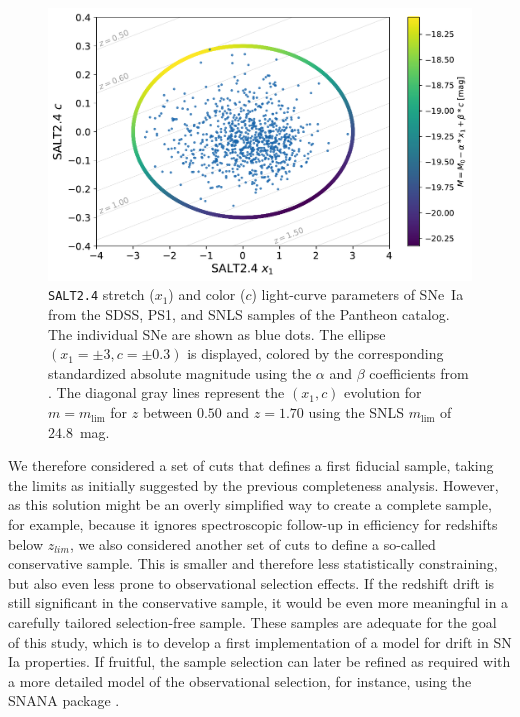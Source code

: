 \documentclass[]{aa}
\begin{document}
\begin{figure}
    \centering
    \includegraphics[width=0.95\linewidth]{Article_figures/zmax_maglim_snls.pdf}
    \caption{\textsc{\texttt{SALT2.4}} stretch ($x_1$) and color ($c$)
        light-curve parameters of SNe~Ia from the SDSS, PS1, and SNLS samples of
        the Pantheon catalog. The individual SNe are shown as blue dots. The
        ellipse $(x_1=\pm3, c=\pm0.3)$ is displayed, colored by the
        corresponding standardized absolute magnitude using the $\alpha$ and
        $\beta$ coefficients from \cite{scolnic2018a}. The diagonal gray lines
        represent the $(x_1, c)$ evolution for $m = m_{\lim}$ for $z$ between
        $0.50$ and $z=1.70$ using the SNLS $m_{\lim}$ of $24.8$~mag.}
    \label{fig:maglim}
\end{figure}

We therefore considered a set of cuts that defines a first fiducial sample,
taking the limits as initially suggested by the previous completeness analysis.
However, as this solution might be an overly simplified way to create a complete
sample, for example, because it ignores spectroscopic follow-up in efficiency
for redshifts below $z_{lim}$, we also considered another set of cuts to define
a so-called conservative sample. This is smaller and therefore less
statistically constraining, but also even less prone to observational selection
effects. If the redshift drift is still significant in the conservative sample,
it would be even more meaningful in a carefully tailored selection-free sample.
These samples are adequate for the goal of this study, which is to develop a
first implementation of a model for drift in SN Ia properties. If fruitful, the
sample selection can later be refined as required with a more detailed model of
the observational selection, for instance, using the SNANA package
\citep{SNANA}.
\end{document}
